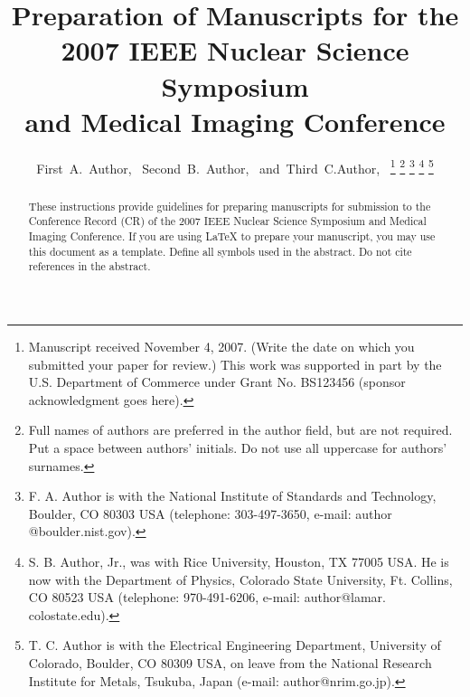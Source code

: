 \documentclass[journal]{IEEEtran}
\begin{document}
\title{Preparation of Manuscripts for the\\
2007 IEEE Nuclear Science Symposium\\
and Medical Imaging Conference}
%
%

\author{First~A.~Author,~
        Second~B.~Author,~
        and~Third~C.Author,~%
\thanks{Manuscript received November 4, 2007. (Write the date on which you submitted your paper for review.) This work was supported in part by the U.S. Department of Commerce under Grant No. BS123456 (sponsor acknowledgment goes here).}%
\thanks{Full names of authors are preferred in the author field, but are not required. Put a space between authors' initials. Do not use all uppercase for authors' surnames.}%
\thanks{F. A. Author is with the National Institute of Standards and Technology, Boulder, CO 80303 USA (telephone: 303-497-3650, e-mail: author @boulder.nist.gov).}%
\thanks{S. B. Author, Jr., was with Rice University, Houston, TX 77005 USA. He is now with the Department of Physics, Colorado State University, Ft. Collins, CO 80523 USA (telephone: 970-491-6206, e-mail: author@lamar. colostate.edu).}%
\thanks{T. C. Author is with the Electrical Engineering Department, University of Colorado, Boulder, CO 80309 USA, on leave from the National Research Institute for Metals, Tsukuba, Japan (e-mail: author@nrim.go.jp).}%
}

\maketitle
\pagestyle{empty}
\thispagestyle{empty}

\begin{abstract}
These instructions provide guidelines for preparing manuscripts for submission to the Conference Record (CR) of the 2007 IEEE Nuclear Science Symposium and Medical Imaging Conference. If you are using {\LaTeX} to prepare your manuscript, you may use this document as a template. Define all symbols used in the abstract. Do not cite references in the abstract. 
\end{abstract}
\end{document}
